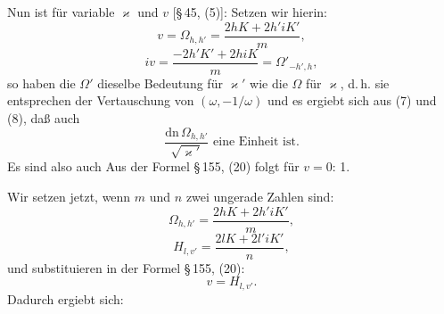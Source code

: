 
Nun ist für variable $\varkappa$ und $v$ [\S\,45, (5)]:
Setzen wir hierin:
\[
v = \Omega_{h,h'} = \dfrac{2hK + 2h'iK'}{m},
\]
\[
iv = \dfrac{-2h'K' + 2hiK}{m} = \Omega'_{-h',h},
\]
so haben die $\Omega'$ dieselbe Bedeutung für $\varkappa'$ wie die $\Omega$ für $\varkappa$, d.\,h. sie entsprechen der Vertauschung von $(\omega, -1/\omega)$ und es ergiebt sich aus (7) und (8), da\ss{} auch
\[
\dfrac{\mathrm{dn}\,\Omega_{h,h'}}{\sqrt{\varkappa'}} \text{ eine Einheit ist.}
\]
Es sind also auch
Aus der Formel \S\,155, (20) folgt für $v=0$:
1. 

Wir setzen jetzt, wenn $m$ und $n$ zwei ungerade Zahlen sind:
\[
\Omega_{h,h'} = \dfrac{2hK + 2h'iK'}{m},
\]
\[
H_{l,v'} = \dfrac{2lK + 2l'iK'}{n}, %
\]
und substituieren in der Formel \S\,155, (20):
\[
v = H_{l,v'}.
\]
Dadurch ergiebt sich:
